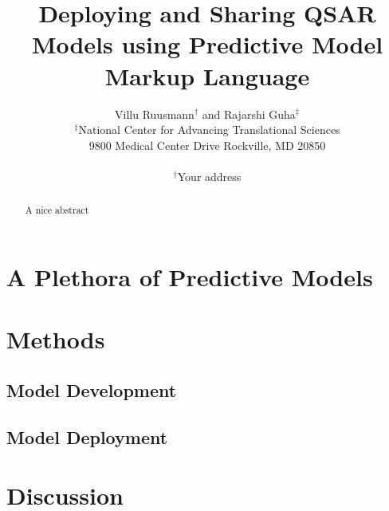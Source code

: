 \documentclass[12pt,letterpaper]{article}
\begin{document}
\title{Deploying and Sharing QSAR Models using Predictive Model Markup Language}
\author{Villu Ruusmann${}^{\dagger}$ and Rajarshi Guha${}^{\ddagger}$\\
${}^{\ddagger}$National Center for Advancing Translational Sciences\\ 9800 Medical Center Drive  Rockville, MD 20850 \\ \\
${}^{\dagger}$Your address }
\date{}
\maketitle
\begin{abstract}
  A nice abstract
\end{abstract}

\section{A Plethora of Predictive Models}
\label{sec:introduction}

\section{Methods}
\label{sec:methods}

\subsection{Model Development}
\label{sec:model-development}


\subsection{Model Deployment}
\label{sec:model-deployment}


\section{Discussion}
\label{sec:discussion}
\end{document}

